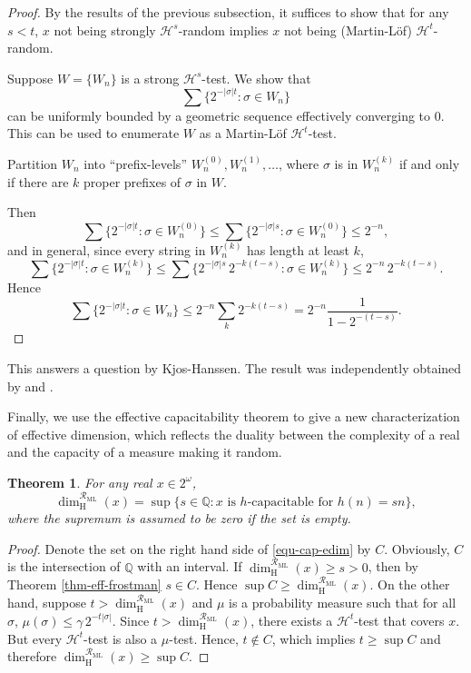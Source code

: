 \documentclass[11pt,reqno]{article}
\theoremstyle{plain}
\newtheorem{thm}{Theorem}
\theoremstyle{definition}
\theoremstyle{remark}
\numberwithin{equation}{section}
\newcommand{\Rat}{\ensuremath{\mathbb{Q}}}
\newcommand{\Cant}{\ensuremath{2^{\omega}}}
\newcommand{\Hmeas}{\ensuremath{\mathcal{H}}}
\newcommand{\Hm}[1]{\ensuremath{\Hmeas^{#1}}}
\newcommand{\Hdim}[1][\mbox{}]{\ensuremath{\dim^{#1}_{\operatorname{H}}}}
\begin{document}
\begin{proof}
	By the results of the previous subsection, it suffices to show that for any $s < t$,
	$x$ not being strongly $\Hm{s}$-random implies $x$ not being (Martin-L\"of) $\Hm{t}$-random.
	
	Suppose $W = \{W_n\}$ is a strong $\Hm{s}$-test. We show that 
	\[
		\sum \{2^{-|\sigma|t} \colon \sigma \in W_n\}
	\]
	can be uniformly bounded by a geometric sequence effectively converging to $0$. This can be used to enumerate $W$ as a Martin-L\"of $\Hm{t}$-test.
	 
	Partition $W_n$ into ``prefix-levels'' $W^{(0)}_n, W^{(1)}_n, \dots$, where 
	$\sigma$ is in $W^{(k)}_n$ if and only if there are $k$ proper prefixes of $\sigma$ in $W$.
	
	Then 
	\[
		\sum \{2^{-|\sigma|t} \colon \sigma \in W^{(0)}_n\} \leq \sum \{2^{-|\sigma|s} \colon \sigma \in W^{(0)}_n\} \leq 2^{-n},
	\]  
	and in general, since every string in $W^{(k)}_n$ has length at least $k$,
	\[
		\sum \{2^{-|\sigma|t} \colon \sigma \in W^{(k)}_n\} \leq  \sum \{2^{-|\sigma|s} \, 2^{-k(t-s)} \colon \sigma \in W^{(k)}_n\} \leq 2^{-n}\, 2^{-k(t-s)}.
	\]
	Hence
	\[
		\sum \{2^{-|\sigma|t} \colon \sigma \in W_n\} \leq 2^{-n} \sum_k 2^{-k(t-s)} = 2^{-n} \frac{1}{1 - 2^{-(t-s)}}.
	\]
 \end{proof}

This answers a question by Kjos-Hanssen. The result was independently obtained by \citet{kjos-hanssen:draft} and \citet{miller:draft}. 

Finally, we use the effective capacitability theorem to give a new characterization of effective dimension, which reflects the duality between the complexity of a real and the capacity of a measure making it random.
  
\begin{thm}
	For any real $x \in \Cant$,
	\begin{equation} \label{equ-cap-edim}
		\Hdim[\mathcal{R}_{\operatorname{ML}}] (x) = \sup \{ s\in \Rat :  x \text{ is $h$-capacitable for $h(n) = sn$} \},
	\end{equation}
	where the supremum is assumed to be zero if the set is empty.
\end{thm}

\begin{proof}
	Denote the set on the right hand side of \eqref{equ-cap-edim} by $C$. Obviously, $C$ is the intersection of $\Rat$ with an interval. If $\Hdim[\mathcal{R}_{\operatorname{ML}}] (x) \geq s >0$, then by Theorem \ref{thm-eff-frostman} $s \in C$. Hence $\sup C \geq \Hdim[\mathcal{R}_{\operatorname{ML}}] (x)$. On the other hand, suppose $t > \Hdim[\mathcal{R}_{\operatorname{ML}}] (x)$ and $\mu$ is a probability measure such that for all $\sigma$, $\mu(\sigma) \leq \gamma \, 2^{-t|\sigma|}$. Since $t > \Hdim[\mathcal{R}_{\operatorname{ML}}] (x)$, there exists a $\Hm{t}$-test that covers $x$. But every $\Hm{t}$-test is also a $\mu$-test. Hence, $t \not\in C$, which implies $t \geq \sup C$ and therefore $\Hdim[\mathcal{R}_{\operatorname{ML}}] (x) \geq \sup C$.
 \end{proof}
\end{document}

